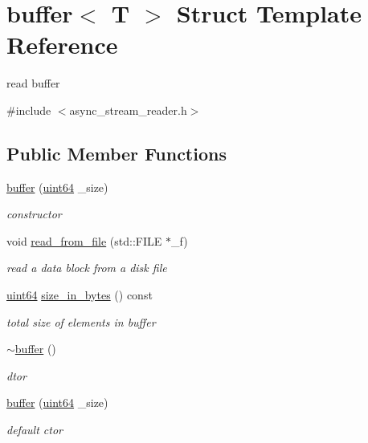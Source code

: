 \hypertarget{structbuffer}{}\section{buffer$<$ T $>$ Struct Template Reference}
\label{structbuffer}


read buffer  




{\ttfamily \#include $<$async\+\_\+stream\+\_\+reader.\+h$>$}

\subsection*{Public Member Functions}
\begin{DoxyCompactItemize}
\item 
\hyperlink{structbuffer_aefd0601854f94ec9c18c05986d218c16}{buffer} (\hyperlink{types_8h_a60e8696a4678cd348e991a1f172e53f7}{uint64} \+\_\+size)
\begin{DoxyCompactList}\small\item\em constructor \end{DoxyCompactList}\item 
void \hyperlink{structbuffer_a2abf8fde8a3d6a1245f57d698e207b74}{read\+\_\+from\+\_\+file} (std\+::\+F\+I\+LE $\ast$\+\_\+f)
\begin{DoxyCompactList}\small\item\em read a data block from a disk file \end{DoxyCompactList}\item 
\hyperlink{types_8h_a60e8696a4678cd348e991a1f172e53f7}{uint64} \hyperlink{structbuffer_a2b74a935bb50716bba0835781545803d}{size\+\_\+in\+\_\+bytes} () const
\begin{DoxyCompactList}\small\item\em total size of elements in buffer \end{DoxyCompactList}\item 
\hyperlink{structbuffer_accefc959744e463ae78a996a2f45f81a}{$\sim$buffer} ()
\begin{DoxyCompactList}\small\item\em dtor \end{DoxyCompactList}\item 
\hyperlink{structbuffer_aefd0601854f94ec9c18c05986d218c16}{buffer} (\hyperlink{types_8h_a60e8696a4678cd348e991a1f172e53f7}{uint64} \+\_\+size)
\begin{DoxyCompactList}\small\item\em default ctor \end{DoxyCompactList}\item 

\end{DoxyCompactItemize}
